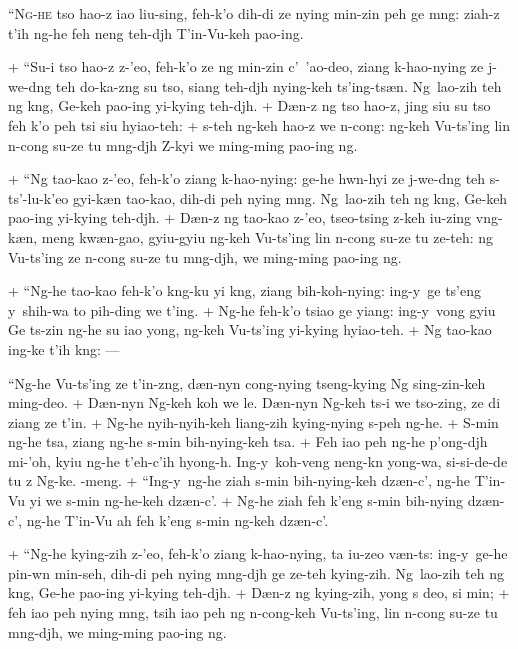 \header
\lettrine{``N}{g-he} tso hao-z iao liu-sing, feh-k'o dih-di ze nying min-zin peh ge m\oo ng: ziah-z t'ih ng-he feh neng teh-dj\oo h T'in-Vu-keh pao-ing.
\par
+	``Su-i tso hao-z z-'eo, feh-k'o ze ng min-zin c'\y\ 'ao-deo, ziang k\oo-hao-nying ze j\y-we-d\oo ng teh do-ka-z\oo ng su tso, siang teh-dj\oo h nying-keh ts'ing-ts\ae n. Ng\oo\ lao-zih teh ng k\oo ng, Ge-keh pao-ing yi-kying teh-dj\oo h.
+	D\ae n-z ng tso hao-z, jing siu su tso feh k'o peh tsi siu hyiao-teh:
+	s-teh ng-keh hao-z we \e n-cong: ng-keh Vu-ts'ing lin \e n-cong su-ze tu m\oo ng-dj\oo h Z-kyi we ming-ming pao-ing ng.
\par
+	``Ng tao-kao z-'eo, feh-k'o ziang k\oo-hao-nying: ge-he hw\e n-hyi ze j\y-we-d\oo ng teh s-ts'\oo-lu-k'eo gyi-k\ae n tao-kao, dih-di peh nying m\oo ng. Ng\oo\ lao-zih teh ng k\oo ng, Ge-keh pao-ing yi-kying teh-dj\oo h.
+	D\ae n-z ng tao-kao z-'eo, tseo-tsing z-keh iu-zing v\oo ng-k\ae n, meng kw\ae n-gao, gyiu-gyiu ng-keh Vu-ts'ing lin \e n-cong su-ze tu ze-teh: ng Vu-ts'ing ze \e n-cong su-ze tu m\oo ng-dj\oo h, we ming-ming pao-ing ng.
\par
+	``Ng-he tao-kao feh-k'o k\oo ng-ku yi k\oo ng, ziang bih-koh-nying: ing-y\y\ ge ts'eng y\y\ shih-wa to pih-ding we t'ing.
+	Ng-he feh-k'o tsiao ge yiang: ing-y\y\ vong gyiu Ge ts-zin ng-he su iao y\y ong, ng-keh Vu-ts'ing yi-kying hyiao-teh.
+	Ng tao-kao ing-ke t'ih k\oo ng: --- \par ``Ng\oo-he Vu-ts'ing ze t'in-z\oo ng, d\ae n-ny\y n cong-nying tseng-kying Ng sing-zin-keh ming-deo.
+	D\ae n-ny\y n Ng-keh koh we le. D\ae n-ny\y n Ng-keh ts-i we tso-zing, ze di ziang ze t'in.
+	Ng\oo-he nyih-nyih-keh liang-zih kying-nying s-peh ng\oo-he.
+	S\oo-min ng\oo-he tsa, ziang ng\oo-he s\oo-min bih-nying-keh tsa.
+	Feh iao peh ng\oo-he p'ong-dj\oo h mi-'oh, kyiu ng\oo-he t'eh-c'ih hy\y ong-\oo h. Ing-y\y\ koh-veng neng-k\e n y\y ong-wa, si-si-de-de tu z Ng-ke. \OO-meng.
+	``Ing-y\y\ ng-he ziah s\oo-min bih-nying-keh dz\ae n-c'\y, ng-he T'in-Vu yi we s\oo-min ng-he-keh dz\ae n-c'\y.
+	Ng-he ziah feh k'eng s\oo-min bih-nying dz\ae n-c'\y, ng-he T'in-Vu ah feh k'eng s\oo-min ng-keh dz\ae n-c'\y.
\par
+	``Ng-he kying-zih z-'eo, feh-k'o ziang k\oo-hao-nying, ta iu-zeo v\ae n-ts: ing-y\y\ ge-he pin-w\e n min-seh, dih-di peh nying m\oo ng-dj\oo h ge ze-teh kying-zih. Ng\oo\ lao-zih teh ng k\oo ng, Ge-he pao-ing yi-kying teh-dj\oo h.
+	D\ae n-z ng kying-zih, y\y ong s deo, si min;
+	feh iao peh nying m\oo ng, tsih iao peh ng \e n-cong-keh Vu-ts'ing, lin \e n-cong su-ze tu m\oo ng-dj\oo h, we ming-ming pao-ing ng.
